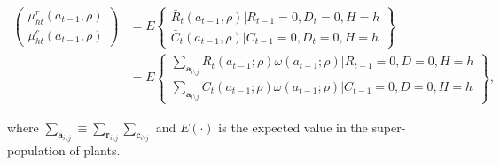 \documentclass[]{article}
\begin{document}
\begin{align*}
\begin{pmatrix}
\mu^r_{ht}(a_{t-1}, \rho) \\
\mu^c_{ht}(a_{t-1}, \rho) 
\end{pmatrix} &= E
\left\{ 
\begin{array}{l}
  \bar{R}_{t}(a_{t-1}, \rho) | R_{t-1} = 0, D_t = 0, H = h \\ 
  \bar{C}_{t}(a_{t-1}, \rho) | C_{t-1} = 0, D_t = 0, H = h
\end{array}
\right\} \\
&= 
E \left\{
\begin{array}{l}
  \sum_{\mathbf{a}_{i \setminus j}} R_{t}(a_{t-1}; \rho) \omega(a_{t-1}; \rho) | R_{t-1} = 0, D = 0, H = h \\ 
  \sum_{\mathbf{a}_{i \setminus j}} C_{t}(a_{t-1}; \rho) \omega(a_{t-1}; \rho) | C_{t-1} = 0, D = 0, H = h
\end{array}
\right\}
,
\end{align*}

where
\(\sum_{\mathbf{a}_{i \setminus j}} \equiv \sum_{\mathbf{r}_{i \setminus j}} \sum_{\mathbf{c}_{i\setminus j}}\)
and \(E(\cdot)\) is the expected value in the super-population of
plants.
\end{document}
